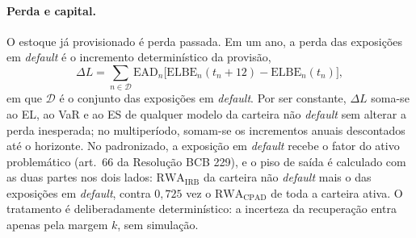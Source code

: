 \documentclass[11pt,a4paper]{article}
\begin{document}
\paragraph{Perda e capital.} O estoque já provisionado é perda passada. Em um ano, a perda das exposições em \emph{default} é o incremento determinístico da provisão,
\begin{equation}\label{eq:dl}
\Delta L=\sum_{n\in\mathcal D}\mathrm{EAD}_n\bigl[\mathrm{ELBE}_n(t_n+12)-\mathrm{ELBE}_n(t_n)\bigr],
\end{equation}
em que $\mathcal D$ é o conjunto das exposições em \emph{default}. Por ser constante, $\Delta L$ soma-se ao EL, ao VaR e ao ES de qualquer modelo da carteira não \emph{default} sem alterar a perda inesperada; no multiperíodo, somam-se os incrementos anuais descontados até o horizonte. No padronizado, a exposição em \emph{default} recebe o fator do ativo problemático (art.~66 da Resolução BCB 229), e o piso de saída é calculado com as duas partes nos dois lados: $\mathrm{RWA}_{\mathrm{IRB}}$ da carteira não \emph{default} mais o das exposições em \emph{default}, contra $0{,}725$ vez o $\mathrm{RWA}_{\mathrm{CPAD}}$ de toda a carteira ativa. O tratamento é deliberadamente determinístico: a incerteza da recuperação entra apenas pela margem $k$, sem simulação.
\end{document}
